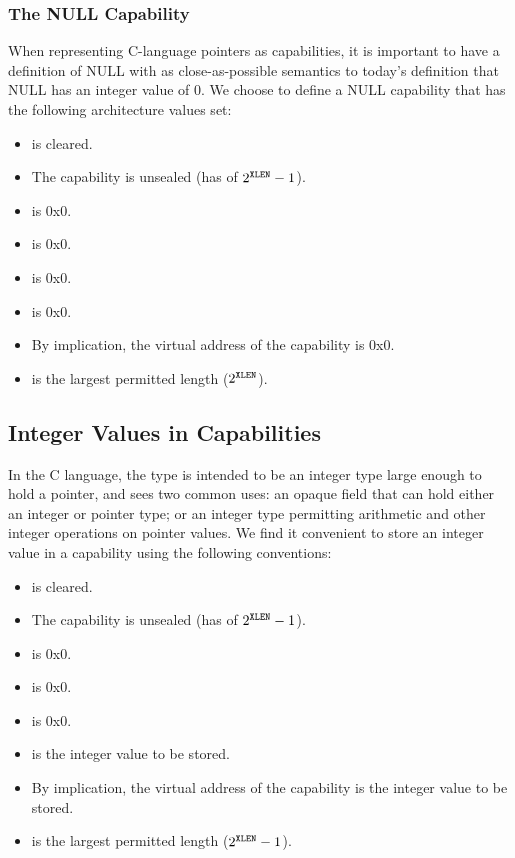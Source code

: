 \subsubsection{The NULL Capability}

When representing C-language pointers as capabilities, it is important to have
a definition of NULL with as close-as-possible semantics to today's
definition that NULL has an integer value of 0.
We choose to define a NULL capability that has the following architecture
values set:

\begin{itemize}
\item \ctag{} is cleared.
\item The capability is unsealed (has \cotype{} of $2^{{\texttt{XLEN}}{}}-1$).
\item \cperms{} is 0x0.
\item \cflags{} is 0x0.
\item \cbase{} is 0x0.
\item \coffset{} is 0x0.
\item By implication, the virtual address of the capability is 0x0.
\item \clength{} is the largest permitted length ($2^{{\texttt{XLEN}}{}}$).
\end{itemize}

\subsection{Integer Values in Capabilities}
\label{subsection:integer_values_in_capabilities}

In the C language, the  type is intended to be an integer
type large enough to hold a pointer, and sees two common uses: an opaque field
that can hold either an integer or pointer type; or an integer type permitting
arithmetic and other integer operations on pointer values.
We find it convenient to store an integer value in a capability using the
following conventions:

\begin{itemize}
\item \ctag{} is cleared.
\item The capability is unsealed (has \cotype{} of $2^{{\texttt{XLEN}}{}}-1$).
\item \cperms{} is 0x0.
\item \cflags{} is 0x0.
\item \cbase{} is 0x0.
\item \coffset{} is the integer value to be stored.
\item By implication, the virtual address of the capability is the integer
  value to be stored.
\item \clength{} is the largest permitted length ($2^{{\texttt{XLEN}}{}}-1$).
\end{itemize}

